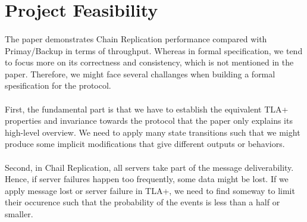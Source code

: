 \section{Project Feasibility}
\setcounter{subsection}{0}
\renewcommand*{\thesubsection}{\Alph{subsection}.}

\paragraph{}
The paper demonstrates Chain Replication performance compared with Primay/Backup in terms of throughput. Whereas in formal specification, we tend to focus more on its correctness and consistency, which is not mentioned in the paper. Therefore, we might face several challanges when building a formal spesification for the protocol. 

\paragraph{}
First, the fundamental part is that we have to establish the equivalent TLA+ properties and invariance towards the protocol that the paper only explains its high-level overview. We need to apply many state transitions such that we might produce some implicit modifications that give different outputs or behaviors. 

\paragraph{}
Second, in Chail Replication, all servers take part of the message deliverability. Hence, if server failures happen too frequently, some data might be lost. If we apply message lost or server failure in TLA+, we need to find someway to limit their occurence such that the probability of the events is less than a half or smaller.